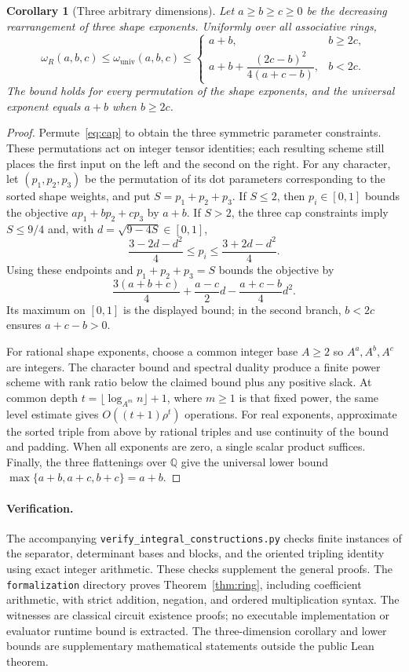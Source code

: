 \documentclass[11pt]{article}
\newtheorem{corollary}[theorem]{Corollary}
\theoremstyle{remark}
\newcommand{\Q}{\mathbb Q}
\begin{document}
\begin{corollary}[Three arbitrary dimensions]\label{cor:three}
Let $a\geq b\geq c\geq0$ be the decreasing rearrangement of three
shape exponents. Uniformly over all associative rings,
\[
 \omega_R(a,b,c)\leq\omega_{\mathrm{univ}}(a,b,c)
 \leq
 \begin{cases}
 a+b,&b\geq2c,\\[2pt]
 a+b+\dfrac{(2c-b)^2}{4(a+c-b)},&b<2c.
 \end{cases}
\]
The bound holds for every permutation of the shape exponents,
and the universal exponent equals $a+b$ when $b\geq2c$.
\end{corollary}
\begin{proof}
Permute~\eqref{eq:cap} to obtain the three symmetric parameter
constraints. These permutations act on integer tensor identities;
each resulting scheme still places the first input on the left and
the second on the right.
For any character, let $(p_1,p_2,p_3)$ be the permutation of its dot
parameters corresponding to the sorted shape weights, and put
$S=p_1+p_2+p_3$. If $S\leq2$, then $p_i\in[0,1]$ bounds the
objective $ap_1+bp_2+cp_3$ by $a+b$.
If $S>2$, the three cap constraints imply $S\leq9/4$ and, with
$d=\sqrt{9-4S}\in[0,1]$,
\[
 \frac{3-2d-d^2}{4}\leq p_i\leq\frac{3+2d-d^2}{4}.
\]
Using these endpoints and $p_1+p_2+p_3=S$ bounds the objective by
\[
 \frac{3(a+b+c)}4+\frac{a-c}2d-\frac{a+c-b}4d^2.
\]
Its maximum on $[0,1]$ is the displayed bound; in the second branch,
$b<2c$ ensures $a+c-b>0$.

For rational shape exponents, choose a common integer base $A\geq2$
so $A^a,A^b,A^c$ are integers. The character bound and spectral
duality produce a finite power scheme with rank ratio below the
claimed bound plus any positive slack. At common depth
$t=\lfloor\log_{A^m}n\rfloor+1$, where $m\geq1$ is that fixed power,
the same level estimate gives $O((t+1)\rho^t)$ operations.
For real exponents, approximate the sorted triple from above by
rational triples and use continuity of the bound and padding.
When all exponents are zero, a single scalar product suffices.
Finally, the three flattenings over $\Q$ give the universal lower
bound $\max\{a+b,a+c,b+c\}=a+b$.
\end{proof}

\paragraph{Verification.}
The accompanying \texttt{verify\_integral\_constructions.py} checks
finite instances of the separator, determinant bases and blocks,
and the oriented tripling identity using exact integer arithmetic.
These checks supplement the general proofs. The \texttt{formalization}
directory proves Theorem~\ref{thm:ring}, including coefficient arithmetic,
with strict addition, negation, and ordered multiplication syntax.
The witnesses are classical circuit existence proofs; no executable
implementation or evaluator runtime bound is extracted. The
three-dimension corollary and lower bounds are supplementary mathematical
statements outside the public Lean theorem.
\end{document}
